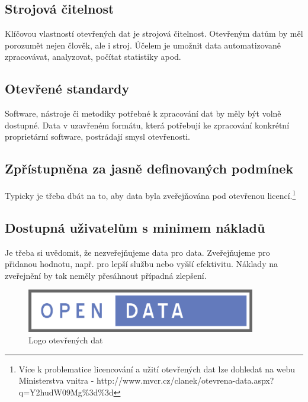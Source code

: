 \subsection*{Strojová čitelnost}

Klíčovou vlastností otevřených dat je strojová čitelnost. Otevřeným datům by měl porozumět nejen člověk, ale i stroj. Účelem je umožnit data automatizovaně zpracovávat, analyzovat, počítat statistiky apod.

\subsection*{Otevřené standardy}

Software, nástroje či metodiky potřebné k zpracování dat by měly být volně dostupné. Data v uzavřeném formátu, která potřebují ke zpracování konkrétní proprietární software, postrádají smysl otevřenosti.

\subsection*{Zpřístupněna za jasně definovaných podmínek}

Typicky je třeba dbát na to, aby data byla zveřejňována pod otevřenou licencí.\footnote{Více k problematice licencování a užití otevřených dat lze dohledat na webu Ministerstva vnitra - http://www.mvcr.cz/clanek/otevrena-data.aspx?q=Y2hudW09Mg\%3d\%3d}

\subsection*{Dostupná uživatelům s minimem nákladů}

Je třeba si uvědomit, že nezveřejňujeme data pro data. Zveřejňujeme pro přidanou hodnotu, např. pro lepší službu nebo vyšší efektivitu. Náklady na zveřejnění by tak neměly přesáhnout případná zlepšení.
\newline

\begin{figure}[h]
\centerline{\includegraphics[width=100mm]{img/opendata.eps}}
\caption{Logo otevřených dat}
\label{modules}
\end{figure}

\newpage

